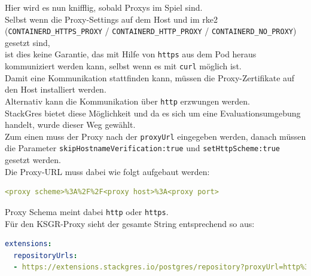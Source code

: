 \begin{flushleft}
    Hier wird es nun knifflig, sobald Proxys im Spiel sind.\\
    Selbst wenn die Proxy-Settings auf dem Host und im \gls{rke2} (\texttt{CONTAINERD\_HTTPS\_PROXY} / \texttt{CONTAINERD\_HTTP\_PROXY} / \texttt{CONTAINERD\_NO\_PROXY}) gesetzt sind,\\
    ist dies keine Garantie, das mit Hilfe von \texttt{https} aus dem Pod heraus kommuniziert werden kann, selbst wenn es mit \texttt{curl} möglich ist.\\
    Damit eine Kommunikation stattfinden kann, müssen die Proxy-Zertifikate auf den Host installiert werden.\\
    Alternativ kann die Kommunikation über \texttt{http} erzwungen werden.\\
    StackGres bietet diese Möglichkeit und da es sich um eine Evaluationsumgebung handelt, wurde dieser Weg gewählt.\\
    Zum einen muss der Proxy nach der \texttt{proxyUrl} eingegeben werden, danach müssen die Parameter \texttt{skipHostnameVerification:true} und \texttt{setHttpScheme:true} gesetzt werden.\\
    Die Proxy-URL muss dabei wie folgt aufgebaut werden:
\lstset{style=gra_codestyle}
\begin{lstlisting}[language=yaml, caption=StackGres - values.yaml - Extension proxyUrl,captionpos=b,label={lst:stackgres_extension_proxyurl},breaklines=true]
<proxy scheme>%3A%2F%2F<proxy host>%3A<proxy port>
\end{lstlisting}
    Proxy Schema meint dabei \texttt{http} oder \texttt{https}.\\
    Für den KSGR-Proxy sieht der gesamte String entsprechend so aus:
\lstset{style=gra_codestyle}
\begin{lstlisting}[language=yaml, caption=StackGres - values.yaml - Extension Proxy,captionpos=b,label={lst:stackgres_extension_proxy},breaklines=true]
extensions:
  repositoryUrls:
  - https://extensions.stackgres.io/postgres/repository?proxyUrl=http%3A%2F%2Fsproxy.sivc.first-it.ch%3A8080?skipHostnameVerification:true&setHttpScheme:true
\end{lstlisting}
\end{flushleft}
